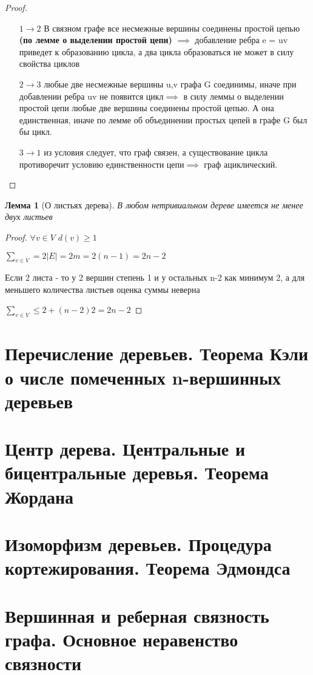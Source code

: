 \documentclass[a4paper]{article}
\newtheorem{lemma}{Лемма}[section]
\theoremstyle{definition}
\theoremstyle{remark}
\begin{document}
    \begin{proof}
        \begin{itemize}
            \item[$1\to 2$] В связном графе все несмежные вершины соединены простой цепью \textbf{(по лемме о выделении простой цепи)}
            $\implies$ добавление ребра e = uv приведет к образованию цикла, а два цикла образоваться не может в силу свойства циклов
            \item[$2 \to 3$] любые две несмежные вершины u,v графа G соединимы, иначе при добавлении ребра uv не появится цикл$\implies$
            в силу леммы о выделении простой цепи любые две вершины соединены простой цепью. А она единственная, иначе по лемме об 
            объединении простых цепей в графе G был бы цикл.
            \item[$3\to1$]из условия следует, что граф связен, а существование цикла противоречит условию единственности цепи$\implies$
            граф ациклический.
        \end{itemize}
    \end{proof}
    \begin{lemma}[О листьях дерева]
        В любом нетривиальном дереве имеется не менее двух листьев
    \end{lemma}
    \begin{proof}
        $\forall v\in V$ $d(v)\geq 1$

        $\sum_{v\in V} = 2|E|=2m=2(n-1)=2n-2$

        Если 2 листа - то у 2 вершин степень 1 и у остальных n-2 как минимум 2,
        а для меньшего количества листьев оценка суммы неверна

        $\sum_{v\in V} \leq 2 + (n-2)2 = 2n - 2$
    \end{proof}
    \section{Перечисление деревьев. Теорема Кэли о числе помеченных n-вершинных деревьев}
    \section{Центр дерева. Центральные и бицентральные деревья. Теорема Жордана}
    \section{Изоморфизм деревьев. Процедура кортежирования. Теорема Эдмондса}
    \section{Вершинная и реберная связность графа. Основное неравенство связности}
\end{document}
